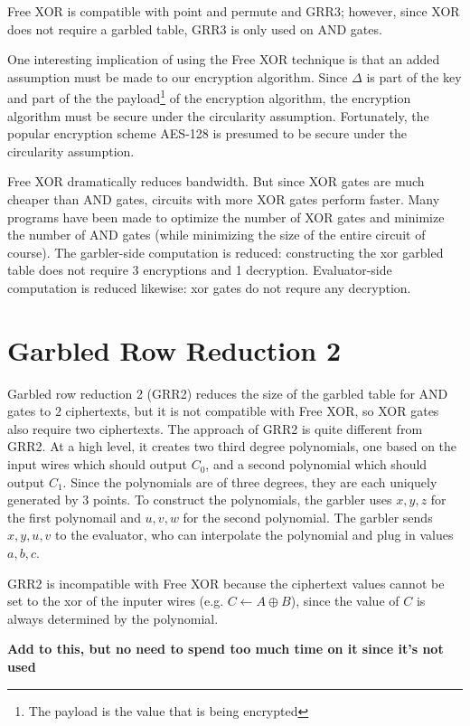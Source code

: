 Free XOR is compatible with point and permute and GRR3; however, since XOR does not require a garbled table, GRR3 is only used on AND gates.

One interesting implication of using the Free XOR technique is that an added assumption must be made to our encryption algorithm.
Since $\Delta$ is part of the key and part of the the payload\footnote{The payload is the value that is being encrypted} of the encryption algorithm, the encryption algorithm must be secure under the circularity assumption.
Fortunately, the popular encryption scheme AES-128 is presumed to be secure under the circularity assumption.

Free XOR dramatically reduces bandwidth.
But since XOR gates are much cheaper than AND gates, circuits with more XOR gates perform faster.
Many programs have been made to optimize the number of XOR gates and minimize the number of AND gates (while minimizing the size of the entire circuit of course).
The garbler-side computation is reduced: constructing the xor garbled table does not require 3 encryptions and 1 decryption.
Evaluator-side computation is reduced likewise: xor gates do not requre any decryption.

\section{Garbled Row Reduction 2}
Garbled row reduction 2 (GRR2) reduces the size of the garbled table for AND gates to $2$ ciphertexts, but it is not compatible with Free XOR, so XOR gates also require two ciphertexts.
The approach of GRR2 is quite different from GRR2. 
At a high level, it creates two third degree polynomials, one based on the input wires which should output $C_0$, and a second polynomial which should output $C_1$.
Since the polynomials are of three degrees, they are each uniquely generated by $3$ points. 
To construct the polynomials, the garbler uses $x,y,z$ for the first polynomail and $u,v,w$ for the second polynomial.
The garbler sends $x,y,u,v$ to the evaluator, who can interpolate the polynomial and plug in values $a,b,c$.

GRR2 is incompatible with Free XOR because the ciphertext values cannot be set to the xor of the inputer wires (e.g. $C \gets A \oplus B$), since the value of $C$ is always determined by the polynomial.

\textbf{Add to this, but no need to spend too much time on it since it's not used}

